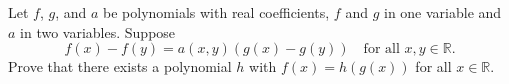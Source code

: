 Let $f$, $g$, and $a$ be polynomials with real coefficients, $f$ and $g$ in one variable and $a$ in two variables. Suppose
\[ f(x) - f(y) = a(x, y)(g(x) - g(y)) \quad \text{for all } x, y \in \mathbb{R}. \]
Prove that there exists a polynomial $h$ with $f(x) = h(g(x))$ for all $x \in \mathbb{R}$.
